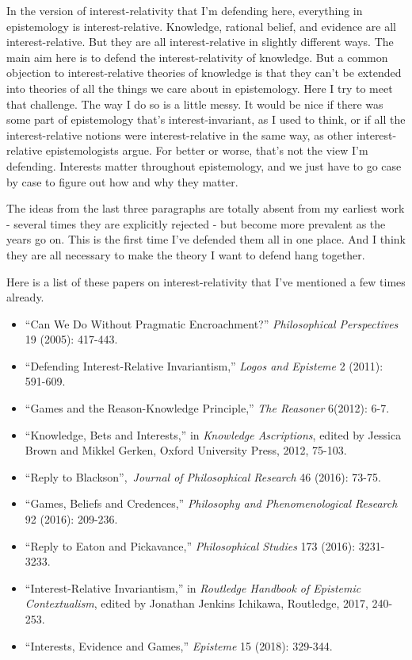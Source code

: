 \documentclass[
  11pt,
]{book}
\providecommand{\tightlist}{%
  \setlength{\itemsep}{0pt}\setlength{\parskip}{0pt}}
\begin{document}
In the version of interest-relativity that I'm defending here, everything in epistemology is interest-relative. Knowledge, rational belief, and evidence are all interest-relative. But they are all interest-relative in slightly different ways. The main aim here is to defend the interest-relativity of knowledge. But a common objection to interest-relative theories of knowledge is that they can't be extended into theories of all the things we care about in epistemology. Here I try to meet that challenge. The way I do so is a little messy. It would be nice if there was some part of epistemology that's interest-invariant, as I used to think, or if all the interest-relative notions were interest-relative in the same way, as other interest-relative epistemologists argue. For better or worse, that's not the view I'm defending. Interests matter throughout epistemology, and we just have to go case by case to figure out how and why they matter.

The ideas from the last three paragraphs are totally absent from my earliest work - several times they are explicitly rejected - but become more prevalent as the years go on. This is the first time I've defended them all in one place. And I think they are all necessary to make the theory I want to defend hang together.

Here is a list of these papers on interest-relativity that I've mentioned a few times already.

\begin{itemize}
\tightlist
\item
  ``Can We Do Without Pragmatic Encroachment?'' \emph{Philosophical Perspectives} 19 (2005): 417-443.
\item
  ``Defending Interest-Relative Invariantism,'' \emph{Logos and Episteme} 2 (2011): 591-609.
\item
  ``Games and the Reason-Knowledge Principle,'' \emph{The Reasoner} 6(2012): 6-7.
\item
  ``Knowledge, Bets and Interests,'' in \emph{Knowledge Ascriptions}, edited by Jessica Brown and Mikkel Gerken, Oxford University Press, 2012, 75-103.
\item
  ``Reply to Blackson'',~\emph{Journal of Philosophical Research} 46 (2016): 73-75.
\item
  ``Games, Beliefs and Credences,'' \emph{Philosophy and Phenomenological Research} 92 (2016): 209-236.
\item
  ``Reply to Eaton and Pickavance,'' \emph{Philosophical Studies} 173 (2016): 3231-3233.
\item
  ``Interest-Relative Invariantism,'' in \emph{Routledge Handbook of Epistemic Contextualism}, edited by Jonathan Jenkins Ichikawa, Routledge, 2017, 240-253.
\item
  ``Interests, Evidence and Games,'' \emph{Episteme} 15 (2018): 329-344.
\end{itemize}
\end{document}
